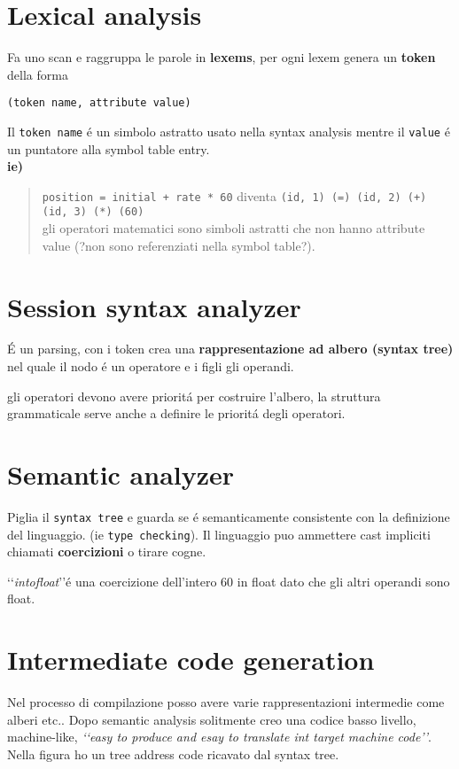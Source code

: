 \section{Lexical analysis}
Fa uno scan e raggruppa le parole in \textbf{lexems}, per ogni lexem genera un \textbf{token} della forma

\begin{center}
    \texttt{(token name, attribute value)} 
\end{center}

Il \texttt{token name} \'e un simbolo astratto usato nella syntax analysis
mentre il \texttt{value} \'e un puntatore alla symbol table entry.\\[5pt]

\textbf{ie)}
\begin{quote}
    \texttt{position = initial + rate * 60} diventa \texttt{(id, 1) (=) (id, 2) (+) (id, 3) (*) (60)}\\
    gli operatori matematici sono simboli astratti che non hanno attribute value (?non sono referenziati nella symbol table?).
\end{quote}


\section{Session syntax analyzer} 
\'E un parsing, con i token crea una \textbf{rappresentazione ad albero (syntax tree)} nel quale 
il nodo \'e un operatore e i figli gli operandi. 

gli operatori devono avere priorit\'a per costruire l'albero, la struttura grammaticale serve anche a 
definire le priorit\'a degli operatori.

\section{Semantic analyzer} 
Piglia il \texttt{syntax tree} e guarda se \'e semanticamente consistente con la definizione del linguaggio.
(ie \texttt{type checking}). Il linguaggio puo ammettere cast impliciti chiamati \textbf{coercizioni} o tirare cogne.

\lq\lq \textit{intofloat}\rq\rq \'e una coercizione dell'intero 60 in float dato che gli altri operandi sono float. 

\section{Intermediate code generation}
Nel processo di compilazione posso avere varie rappresentazioni intermedie come alberi etc..
Dopo semantic analysis solitmente creo una codice basso livello, machine-like, \textit{\lq\lq easy to 
produce and esay to translate int target machine code\rq\rq}. Nella figura ho un tree address code
ricavato dal syntax tree. 

